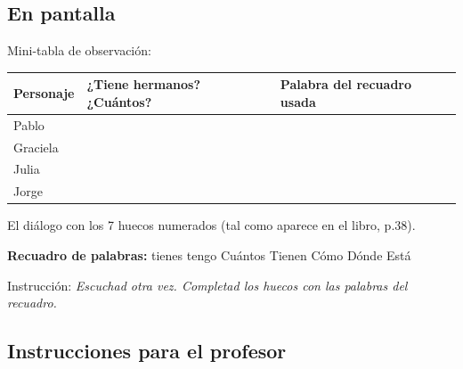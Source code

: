 \documentclass[a4paper,11pt]{article}
\begin{document}
\vspace{0.5cm}

\subsection*{En pantalla}

Mini-tabla de observación:

\vspace{0.3cm}

\begin{center}
\renewcommand{\arraystretch}{1.5}
\begin{tabular}{|>{\centering\arraybackslash}p{3cm}|>{\centering\arraybackslash}p{5cm}|>{\centering\arraybackslash}p{5cm}|}
\hline
\rowcolor{azulg!15}
\textbf{Personaje} & \textbf{¿Tiene hermanos? ¿Cuántos?} & \textbf{Palabra del recuadro usada} \\
\hline
Pablo & & \\
\hline
Graciela & & \\
\hline
Julia & & \\
\hline
Jorge & & \\
\hline
\end{tabular}
\end{center}

\vspace{0.3cm}

El diálogo con los 7 huecos numerados (tal como aparece en el libro, p.38).

\vspace{0.3cm}

\noindent\colorbox{gris}{\parbox{\dimexpr\linewidth-2\fboxsep}{%
\centering\textbf{Recuadro de palabras:} tienes \quad tengo \quad Cuántos \quad Tienen \quad Cómo \quad Dónde \quad Está
}}

\vspace{0.3cm}

Instrucción: \textit{Escuchad otra vez. Completad los huecos con las palabras del recuadro.}

\vspace{0.5cm}

\subsection*{Instrucciones para el profesor}
\end{document}
